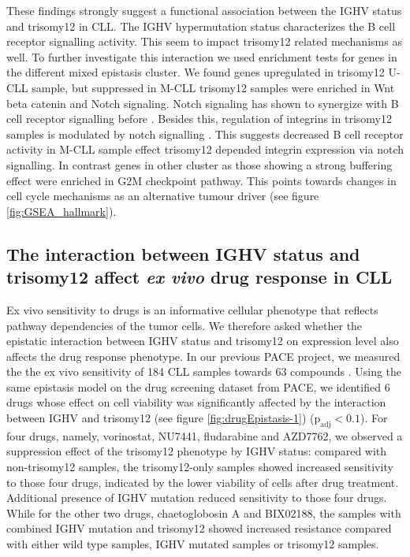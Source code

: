These findings strongly suggest a functional association between the IGHV status and trisomy12 in CLL. The IGHV hypermutation status characterizes the B cell receptor signalling activity. This seem to impact trisomy12 related mechanisms as well. To further investigate this interaction we used enrichment tests for genes in the different mixed epistasis cluster. We found genes upregulated in trisomy12 U-CLL sample, but suppressed in M-CLL trisomy12 samples were enriched in Wnt beta catenin and Notch signaling.
Notch signaling has shown to synergize with B cell receptor signalling before \citep{Thomas2007}. Besides this, regulation of integrins in trisomy12 samples is modulated by notch signalling \citep{Riches2014}. This suggests decreased B cell receptor activity in M-CLL sample effect trisomy12 depended integrin expression via notch signalling. 
In contrast genes in other cluster as those showing a strong buffering effect were enriched in G2M checkpoint pathway. This points towards changes in cell cycle mechanisms as an alternative tumour driver (see figure \ref{fig:GSEA_hallmark}). 

\subsection{The interaction between IGHV status and trisomy12 affect \textit{ex vivo} drug response in CLL}

Ex vivo sensitivity to drugs is an informative cellular phenotype that reflects pathway dependencies of the tumor cells. We therefore asked whether the epistatic interaction between IGHV status and trisomy12 on expression level also affects the drug response phenotype.  In our previous PACE project, we measured the the ex vivo sensitivity of 184 CLL samples towards 63 compounds \citep{Dietrich}. Using the same epistasis model on the drug screening dataset from PACE, we identified 6 drugs whose effect on cell viability was significantly affected by the interaction between IGHV and trisomy12 (see figure \ref{fig:drugEpistasis-1}) ($\text{p}_\text{adj} < 0.1$). For four drugs, namely, vorinostat, NU7441, fludarabine and AZD7762, we observed a suppression effect of the trisomy12 phenotype by IGHV status: compared with non-trisomy12 samples, the trisomy12-only samples showed increased sensitivity to those four drugs, indicated by the lower viability of cells after drug treatment. Additional presence of IGHV mutation reduced sensitivity to those four drugs. While for the other two drugs, chaetoglobosin A and BIX02188, the samples with combined IGHV mutation and trisomy12 showed increased resistance compared with either wild type samples, IGHV mutated samples or trisomy12 samples. 

